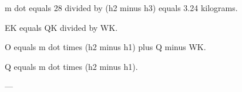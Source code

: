 m dot equals 28 divided by (h2 minus h3) equals 3.24 kilograms.

EK equals QK divided by WK.

O equals m dot times (h2 minus h1) plus Q minus WK.

Q equals m dot times (h2 minus h1).

---